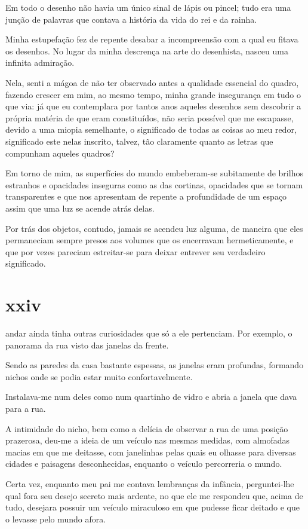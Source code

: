 Em todo o desenho não havia um único sinal de lápis ou pincel; tudo era uma
junção de palavras que contava a história da vida do rei e da rainha.

Minha estupefação fez de repente desabar a incompreensão com a qual eu fitava
os desenhos. No lugar da minha descrença na arte do desenhista, nasceu uma
infinita admiração.

Nela, senti a mágoa de não ter observado antes a qualidade essencial do
quadro, fazendo crescer em mim, ao mesmo tempo, minha grande insegurança em
tudo o que via: já que eu contemplara por tantos anos aqueles desenhos sem
descobrir a própria matéria de que eram constituídos, não seria possível que
me escapasse, devido a uma miopia semelhante, o significado de todas as
coisas ao meu redor, significado este nelas inscrito, talvez, tão claramente
quanto as letras que compunham aqueles quadros?

Em torno de mim, as superfícies do mundo embeberam-se subitamente de brilhos
estranhos e opacidades inseguras como as das cortinas, opacidades que se
tornam transparentes e que nos apresentam de repente a profundidade de um
espaço assim que uma luz se acende atrás delas.

Por trás dos objetos, contudo, jamais se acendeu luz alguma, de maneira que
eles permaneciam sempre presos aos volumes que os encerravam hermeticamente,
e que por vezes pareciam estreitar-se para deixar entrever seu verdadeiro
significado.


\section{xxiv} 

 andar ainda tinha outras curiosidades que só a ele
 pertenciam. Por exemplo, o panorama da rua visto das janelas da frente.

Sendo as paredes da casa bastante espessas, as janelas eram profundas,
formando nichos onde se podia estar muito confortavelmente.

Instalava-me num deles como num quartinho de vidro e abria a janela que dava
para a rua. 

A intimidade do nicho, bem como a delícia de observar a rua de uma posição
prazerosa, deu-me a ideia de um veículo nas mesmas medidas, com almofadas
macias em que me deitasse, com janelinhas pelas quais eu olhasse para
diversas cidades e paisagens desconhecidas, enquanto o veículo percorreria o
mundo.

Certa vez, enquanto meu pai me contava lembranças da infância, perguntei-lhe
qual fora seu desejo secreto mais ardente, no que ele me respondeu que, acima
de tudo, desejara possuir um veículo miraculoso em que pudesse ficar deitado
e que o levasse pelo mundo afora.

